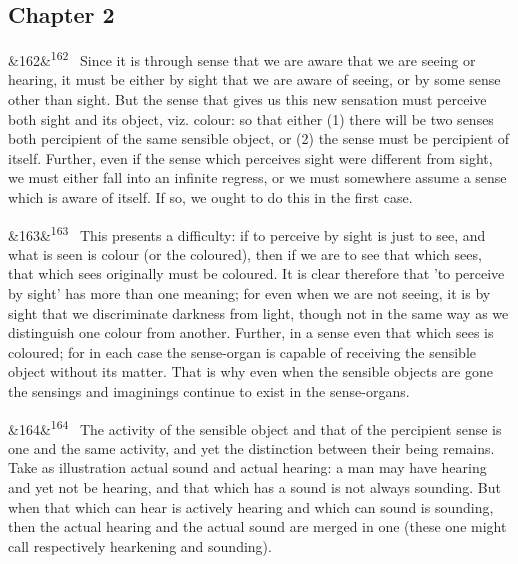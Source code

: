 \documentclass[12pt]{article}
\newcommand{\para}[1][]{\par\noindent\ifx&#1&\else\textsuperscript{\footnotesize #1}~\fi}
\begin{document}
\subsection*{Chapter 2}

\para[162] Since it is through sense that we are aware that we are seeing or hearing, it must be either by sight that we are aware of seeing, or by some sense other than sight. But the sense that gives us this new sensation must perceive both sight and its object, viz. colour: so that either (1) there will be two senses both percipient of the same sensible object, or (2) the sense must be percipient of itself. Further, even if the sense which perceives sight were different from sight, we must either fall into an infinite regress, or we must somewhere assume a sense which is aware of itself. If so, we ought to do this in the first case.

\para[163] This presents a difficulty: if to perceive by sight is just to see, and what is seen is colour (or the coloured), then if we are to see that which sees, that which sees originally must be coloured. It is clear therefore that 'to perceive by sight' has more than one meaning; for even when we are not seeing, it is by sight that we discriminate darkness from light, though not in the same way as we distinguish one colour from another. Further, in a sense even that which sees is coloured; for in each case the sense-organ is capable of receiving the sensible object without its matter. That is why even when the sensible objects are gone the sensings and imaginings continue to exist in the sense-organs.

\para[164] The activity of the sensible object and that of the percipient sense is one and the same activity, and yet the distinction between their being remains. Take as illustration actual sound and actual hearing: a man may have hearing and yet not be hearing, and that which has a sound is not always sounding. But when that which can hear is actively hearing and which can sound is sounding, then the actual hearing and the actual sound are merged in one (these one might call respectively hearkening and sounding).
\end{document}
